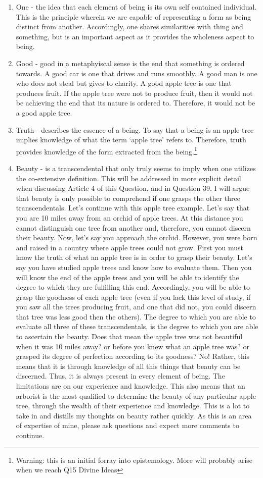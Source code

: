 \documentclass{ucetd}
\begin{document}
\begin{enumerate}
    \item One - the idea that each element of being is its own self contained individual. This is the principle wherein we are capable of representing a form as being distinct from another. Accordingly, one shares similarities with thing and something, but is an important aspect as it provides the wholeness aspect to being.
    \item Good - good in a metaphyiscal sense is the end that something is ordered towards. A good car is one that drives and runs smoothly. A good man is one who does not steal but gives to charity. A good apple tree is one that produces fruit. If the apple tree were not to produce fruit, then it would not be achieving the end that its nature is ordered to. Therefore, it would not be a good apple tree.
    \item Truth - describes the essence of a being. To say that a being is an apple tree implies knowledge of what the term `apple tree' refers to. Therefore, truth provides knowledge of the form extracted from the being.\footnote{Warning: this is an initial forray into epistemology. More will probably arise when we reach Q15 Divine Ideas}
    \item Beauty - is a transcendental that only truly seems to imply when one utilizes the co-extensive definition. This will be addressed in more explicit detail when discussing Article 4 of this Question, and in Question 39. I will argue that beauty is only possible to comprehend if one grasps the other three transcendentals. Let's continue with this apple tree example. Let's say that you are 10 miles away from an orchid of apple trees. At this distance you cannot distinguish one tree from another and, therefore, you cannot discern their beauty. Now, let's say you approach the orchid. However, you were born and raised in a country where apple trees could not grow. First you must know the truth of what an apple tree is in order to grasp their beauty. Let's say you have studied apple trees and know how to evaluate them. Then you will know the end of the apple trees and you will be able to identify the degree to which they are fulfilling this end. Accordingly, you will be able to grasp the goodness of each apple tree (even if you lack this level of study, if you saw all the trees producing fruit, and one that did not, you could discern that tree was less good then the others). The degree to which you are able to evaluate all three of these transcendentals, is the degree to which you are able to ascertain the beauty. Does that mean the apple tree was not beautiful when it was 10 miles away? or before you knew what an apple tree was? or grasped its degree of perfection according to its goodness? No! Rather, this means that it is through knowledge of all this things that beauty can be discerned. Thus, it is always present in every element of being. The limitations are on our experience and knowledge. This also means that an arborist is the most qualified to determine the beauty of any particular apple tree, through the wealth of their experience and knowledge. This is a lot to take in and distills my thoughts on beauty rather quickly. As this is an area of expertise of mine, please ask questions and expect more comments to continue.

\end{enumerate}
\end{document}
